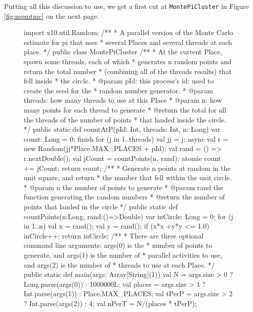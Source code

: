 Putting all this discussion to use, we get a first cut at {\tt MontePiCluster}
in Figure \ref{fig:mpmtmc} on the next page.
\begin{figure}[!htbp]
\hrulefill
\begin{xtennum}[]
import x10.util.Random;
/**
 * A parallel version of the Monte Carlo estimate for pi that uses 
 * several Places and several threads at each place.
 */
public class MontePiCluster {
    /**
     * At the current Place, spawn some threads, each of which
     * generates n random points and return the total number
     * (combining all of the threads results) that fell inside
     * the circle.
     * @param pId: this process's id: used to create the seed for the
     *    random number generator.
     * @param threads: how many threads to use at this Place
     * @param n: how many points for each thread to generate
     * @return the total for all the threads of the number of points
     * that landed inside the circle. 
     */
    public static def countAtP(pId: Int, threads: Int, n: Long) {
        var count: Long = 0;
        finish for (j in 1..threads)  {
            val jj = j;
            async {
                val r = new Random(jj*Place.MAX_PLACES + pId);
                val rand = () => r.nextDouble();
                val jCount = countPoints(n, rand);
                atomic count += jCount;
            }
        }
        return count;
    }
    /**
     * Generate n points at random in the unit square, and return
     * the number that fell within the unit circle.
     * @param n the number of points to generate
     * @param rand the function generating the random numbers
     * @return the number of points that landed in the circle
     */
    public static def countPoints(n:Long, rand:()=>Double) {
        var inCircle: Long = 0;
        for (j in 1..n) {
            val x = rand();
            val y = rand();
            if (x*x +y*y <= 1.0) inCircle++;
        }
        return inCircle;
    }
   /**
    * There are three optional command line arguments: args(0) is the
    * number of points to generate, and args(1) is the number of
    * parallel activities to use, and args(2) is the number of 
    * threads to use at each Place.
    */
   public static def main(args: Array[String](1)) {
      val N = args.size > 0 ? Long.parse(args(0)) : 1000000L;
      val places = args.size > 1 ? Int.parse(args(1)) : Place.MAX_PLACES;
      val tPerP = args.size > 2 ? Int.parse(args(2)) : 4;
      val nPerT = N/(places * tPerP);
}}
\end{xtennum}
\end{figure}
